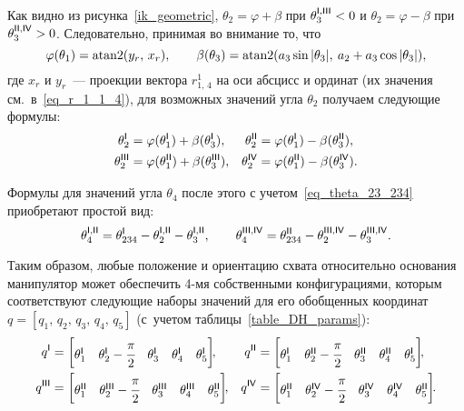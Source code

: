 Как видно из рисунка~\ref{ik_geometric}, $\theta_2 = \varphi + \beta$ при $\theta_3^{\mathsf{I,III}} < 0$ и $\theta_2 = \varphi - \beta$ при $\theta_3^{\mathsf{II,IV}} > 0$.
Следовательно, принимая во внимание то, что
\begin{equation}
    \varphi(\theta_1) = \atan2(y_r,\, x_r),
    \qquad
    \beta(\theta_3) = \atan2(a_3\sin|\theta_3|,\: a_2 + a_3\cos|\theta_3|),
\end{equation}
где $x_r$ и $y_r$~--- проекции вектора $r^1_{1,\,4}$ на оси абсцисс и ординат (их значения см.~в~\eqref{eq_r_1_1_4}), для возможных значений угла $\theta_2$ получаем следующие формулы:
\begin{align}
	\theta_2^{\mathsf{I}} &= \varphi(\theta_1^{\mathsf{I}}) + \beta(\theta_3^{\mathsf{I}}), &
	\theta_2^{\mathsf{II}} &= \varphi(\theta_1^{\mathsf{I}}) - \beta(\theta_3^{\mathsf{II}}),\\
	\theta_2^{\mathsf{III}} &= \varphi(\theta_1^{\mathsf{II}}) + \beta(\theta_3^{\mathsf{III}}), &
	\theta_2^{\mathsf{IV}} &= \varphi(\theta_1^{\mathsf{II}}) - \beta(\theta_3^{\mathsf{IV}})\ldotp
\end{align}

Формулы для значений угла $\theta_4$ после этого с учетом~\eqref{eq_theta_23_234} приобретают простой вид:
\begin{equation}
	\theta_4^{\mathsf{I,II}} = \theta_{234}^{\mathsf{I}} - \theta_{2}^{\mathsf{I,II}} - \theta_{3}^{\mathsf{I,II}},
	\qquad
	\theta_4^{\mathsf{III,IV}} = \theta_{234}^{\mathsf{II}} - \theta_{2}^{\mathsf{III, IV}} - \theta_{3}^{\mathsf{III,IV}}\ldotp
\end{equation}

Таким образом, любые положение и ориентацию схвата относительно основания манипулятор может обеспечить 4-мя собственными конфигурациями, которым соответствуют следующие наборы значений для его обобщенных координат $q=\left[q_1,\,q_2,\,q_3,\,q_4,\,q_5\right]$ (с~учетом таблицы~\ref{table_DH_params}):
\begin{align}
	q^\msf{I} &=
	\begin{bmatrix}
	    \theta_1^\msf{I} & \theta_2^\msf{I} - \cfrac{\pi}{2} & \theta_3^\msf{I} & \theta_4^\msf{I} & \theta_5^\msf{I}
	\end{bmatrix}\!\!,
	&
	q^\msf{II} &=
	\begin{bmatrix}
	    \theta_1^\msf{I} & \theta_2^\msf{II} - \cfrac{\pi}{2} & \theta_3^\msf{II} & \theta_4^\msf{II} & \theta_5^\msf{I}
	\end{bmatrix}\!\!,
	\\
	q^\msf{III} &=
	\begin{bmatrix}
	    \theta_1^\msf{II} & \theta_2^\msf{III} - \cfrac{\pi}{2} & \theta_3^\msf{III} & \theta_4^\msf{III} & \theta_5^\msf{II}
	\end{bmatrix}\!\!,
	&
	q^\msf{IV} &=
	\begin{bmatrix}
	    \theta_1^\msf{II} & \theta_2^\msf{IV} - \cfrac{\pi}{2} & \theta_3^\msf{IV} & \theta_4^\msf{IV} & \theta_5^\msf{II}
	\end{bmatrix}\!\!\ldotp
\end{align}

\newpage
